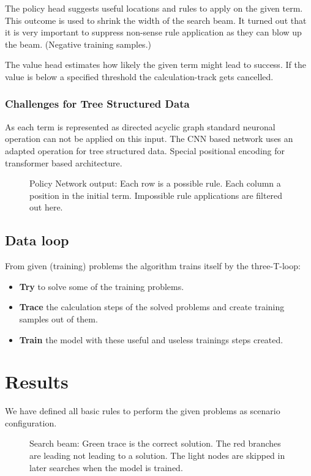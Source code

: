 \documentclass{scrartcl}
\theoremstyle{definition}
\begin{document}
The policy head suggests useful locations and rules to apply on the given term. This outcome is used to shrink the width of the search beam.
It turned out that it is very important to suppress non-sense rule application as they can blow up the beam. (Negative training samples.)

The value head estimates how likely the given term might lead to success. If the value is below a specified threshold the calculation-track gets cancelled.

\subsubsection{Challenges for Tree Structured Data}
As each term is represented as directed acyclic graph standard neuronal operation can not be applied on this input.
The CNN based network uses an adapted operation for tree structured data.
Special positional encoding for transformer based architecture.

\begin{figure}[!htbp]
	\centering
	
	\caption{Policy Network output: Each row is a possible rule. Each column a position in the initial term. Impossible rule applications are filtered out here.} \label{fig:M1}
\end{figure}

\subsection{Data loop}

From given (training) problems the algorithm trains itself by the three-T-loop: 

\begin{itemize}
	\item \textbf{Try} to solve some of the training problems.
	\item \textbf{Trace} the calculation steps of the solved problems and create training samples out of them.
	\item \textbf{Train} the model with these useful and useless trainings steps created.
\end{itemize}

\section{Results}
We have defined all basic rules to perform the given problems as scenario configuration.

\begin{figure}[!htbp]
	\centering
	
	\caption{Search beam: Green trace is the correct solution. The red branches are leading not leading to a solution. The light nodes are skipped in later searches when the model is trained.} \label{fig:M1}
\end{figure}
\end{document}
